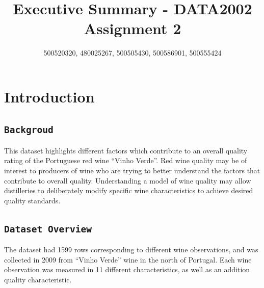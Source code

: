 \documentclass[letterpaper,8pt,twocolumn,twoside,]{pinp}
\title{Executive Summary - DATA2002 Assignment 2}
\author[]{500520320, 480025267, 500505430, 500586901, 500555424}
\affil[]{University of Sydney}
\begin{document}
\verticaladjustment{-2pt}

\maketitle
\thispagestyle{firststyle}



\hypertarget{introduction}{%
\section{Introduction}\label{introduction}}

\hypertarget{backgroud}{%
\subsection{\texorpdfstring{\texttt{Backgroud}}{Backgroud}}\label{backgroud}}

This dataset highlights different factors which contribute to an overall
quality rating of the Portuguese red wine ``Vinho Verde''. Red wine
quality may be of interest to producers of wine who are trying to better
understand the factors that contribute to overall quality. Understanding
a model of wine quality may allow distilleries to deliberately modify
specific wine characteristics to achieve desired quality standards.

\hypertarget{dataset-overview}{%
\subsection{\texorpdfstring{\texttt{Dataset\ Overview}}{Dataset Overview}}\label{dataset-overview}}

The dataset had 1599 rows corresponding to different wine observations,
and was collected in 2009 from ``Vinho Verde'' wine in the north of
Portugal. Each wine observation was measured in 11 different
characteristics, as well as an addition quality characteristic.
\end{document}
